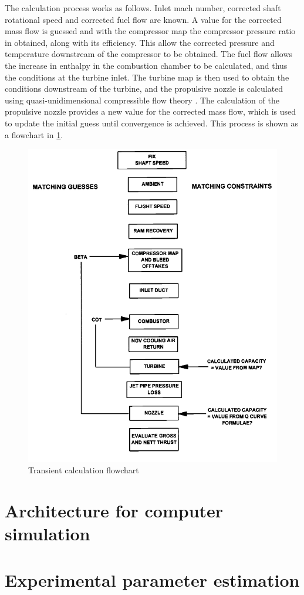 The calculation process works as follows.
Inlet mach number, corrected shaft rotational speed and corrected fuel flow are known.
A value for the corrected mass flow is guessed and with the compressor map the compressor pressure ratio in obtained, along with its efficiency.
This allow the corrected pressure and temperature downstream of the compressor to be obtained.
The fuel flow allows the increase in enthalpy in the combustion chamber to be calculated, and thus the conditions at the turbine inlet.
The turbine map is then used to obtain the conditions downstream of the turbine, and the propulsive nozzle is calculated using quasi-unidimensional compressible flow theory \cite{anderson}.
The calculation of the propulsive nozzle provides a new value for the corrected mass flow, which is used to update the initial guess until 
 convergence is achieved.
This process is shown as a flowchart in \cref{fig:transient_calculation}.

\begin{figure}
    \centering
    \caption{Transient calculation flowchart}
    \label{fig:transient_calculation}
    \includegraphics[width=\textwidth]{fig/transient_calculation_flowchart.png}
\end{figure}

\section{Architecture for computer simulation}
\section{Experimental parameter estimation}

